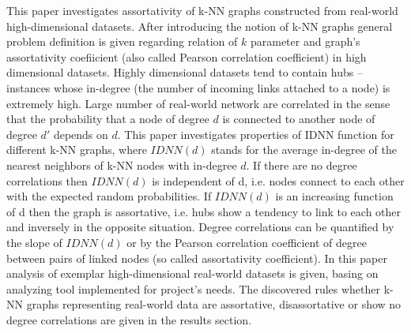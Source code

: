 This paper investigates assortativity of k-NN graphs constructed from real-world high-dimensional datasets.
After introducing the notion of k-NN graphs general problem definition is given regarding relation of $k$ parameter and graph's assortativity coefiicient (also called Pearson correlation coefficient) in high dimensional datasets.
Highly dimensional datasets tend to contain hubs – instances whose in-degree (the number of incoming links attached to a node) is extremely high.
Large number of real-world network are correlated in the sense that the probability that a node of degree $d$ is connected to another node of degree $d'$ depends on $d$.
This paper investigates properties of IDNN function for different k-NN graphs, where $IDNN(d)$ stands for the average in-degree of the nearest neighbors of k-NN nodes with in-degree $d$.
If there are no degree correlations then $IDNN(d)$ is independent of d, i.e. nodes connect to each other with the expected random probabilities.
If $IDNN(d)$ is an increasing function of d then the graph is assortative, i.e. hubs show a tendency to link to each other and inversely in the opposite situation.
Degree correlations can be quantified by the slope of $IDNN(d)$ or by the Pearson correlation coefficient of degree between pairs of linked nodes (so called assortativity coefficient).
In this paper analysis of exemplar high-dimensional real-world datasets is given, basing on analyzing tool implemented for project's needs.
The discovered rules whether k-NN graphs representing real-world data are assortative, disassortative or show no degree correlations are given in the results section.